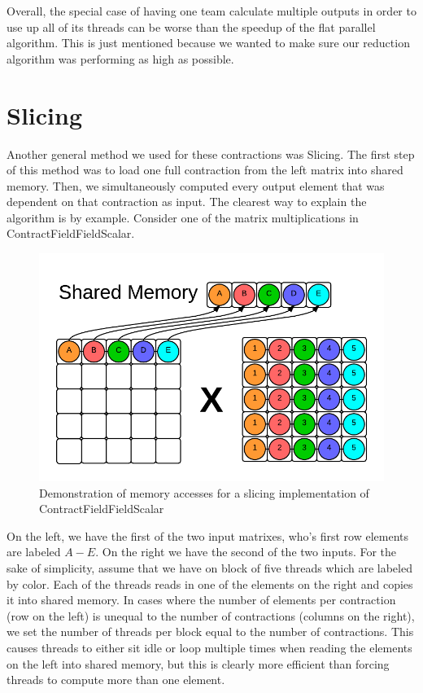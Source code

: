 Overall, the special case of having one team calculate multiple outputs in
order to use up all of its threads can be worse than the speedup of the flat
parallel algorithm. This is just mentioned because we wanted to make sure our
reduction algorithm was performing as high as possible. 

\section{Slicing} \label{slicing}
Another general method we used for these contractions was Slicing. The first
step of this method was to load one full contraction from the left matrix into
shared memory. Then, we simultaneously computed every output element that was
dependent on that contraction as input. The clearest way to explain the
algorithm is by example. Consider one of the matrix multiplications in
ContractFieldFieldScalar. 

\begin{figure}
    \centering
    \includegraphics[scale = .55]{ContractFieldFieldScalarGraphic}
    \caption{Demonstration of memory accesses for a slicing implementation of ContractFieldFieldScalar}
\end{figure}

    On the left, we have the first of the two input matrixes, who's first row
elements are labeled $A-E$. On the right we have the second of the two inputs.
For the sake of simplicity, assume that we have on block of five threads which
are labeled by color. Each of the threads reads in one of the elements on the
right and copies it into shared memory. In cases where the number of elements
per contraction (row on the left) is unequal to the number of contractions
(columns on the right), we set the number of threads per block equal to the
number of contractions. This causes threads to either sit idle or loop multiple
times when reading the elements on the left into shared memory, but this is
clearly more efficient than forcing threads to compute more than one element.
	
